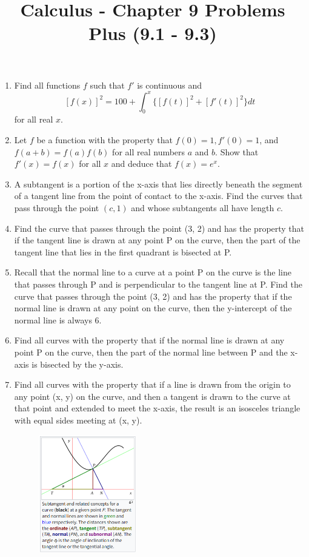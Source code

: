 \documentclass[12pt, a4paper]{article}
\title{Calculus - Chapter 9 Problems Plus (9.1 - 9.3)}
\author{}
\date{}
\begin{document}
\maketitle
\vspace{1em}
\begin{enumerate}
    \item Find all functions $f$ such that $f'$ is continuous and
    \[ [f(x)]^2 = 100 + \int_{0}^{x} \{[f(t)]^2 + [f'(t)]^2\} dt \]
    for all real $x$.
    \item Let $f$ be a function with the property that $f(0)=1, f'(0)=1$, and $f(a+b) = f(a)f(b)$ for all real numbers $a$ and $b$. Show that $f'(x) = f(x)$ for all $x$ and deduce that $f(x) = e^x$.

    \item A subtangent is a portion of the x-axis that lies directly beneath the segment of a tangent line from the point of contact to the x-axis. Find the curves that pass through the point $(c, 1)$ and whose subtangents all have length $c$.

    \item Find the curve that passes through the point (3, 2) and has the property that if the tangent line is drawn at any point P on the curve, then the part of the tangent line that lies in the first quadrant is bisected at P.

    \item Recall that the normal line to a curve at a point P on the curve is the line that passes through P and is perpendicular to the tangent line at P. Find the curve that passes through the point (3, 2) and has the property that if the normal line is drawn at any point on the curve, then the y-intercept of the normal line is always 6.

    \item Find all curves with the property that if the normal line is drawn at any point P on the curve, then the part of the normal line between P and the x-axis is bisected by the y-axis.

    \item Find all curves with the property that if a line is drawn from the origin to any point (x, y) on the curve, and then a tangent is drawn to the curve at that point and extended to meet the x-axis, the result is an isosceles triangle with equal sides meeting at (x, y).

    \begin{figure}[htbp] %
        \centering %
       \includegraphics[width=0.4\textwidth]{graph7.png} %
   \end{figure}

\end{enumerate}
\end{document}
